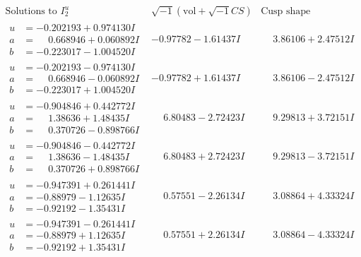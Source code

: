\documentclass[1p]{elsarticle_modified}
\theoremstyle{definition}
\newcommand{\I}{\sqrt{-1}}
\begin{document}
$$\begin{array}{c|c|c}  
\text{Solutions to }I^u_{2}& \I (\text{vol} + \sqrt{-1}CS) & \text{Cusp shape}\\
 \hline 
\begin{aligned}
u &= -0.202193 + 0.974130 I \\
a &= \phantom{-}0.668946 + 0.060892 I \\
b &= -0.223017 - 1.004520 I\end{aligned}
 & -0.97782 - 1.61437 I & \phantom{-}3.86106 + 2.47512 I \\ \hline\begin{aligned}
u &= -0.202193 - 0.974130 I \\
a &= \phantom{-}0.668946 - 0.060892 I \\
b &= -0.223017 + 1.004520 I\end{aligned}
 & -0.97782 + 1.61437 I & \phantom{-}3.86106 - 2.47512 I \\ \hline\begin{aligned}
u &= -0.904846 + 0.442772 I \\
a &= \phantom{-}1.38636 + 1.48435 I \\
b &= \phantom{-}0.370726 - 0.898766 I\end{aligned}
 & \phantom{-}6.80483 - 2.72423 I & \phantom{-}9.29813 + 3.72151 I \\ \hline\begin{aligned}
u &= -0.904846 - 0.442772 I \\
a &= \phantom{-}1.38636 - 1.48435 I \\
b &= \phantom{-}0.370726 + 0.898766 I\end{aligned}
 & \phantom{-}6.80483 + 2.72423 I & \phantom{-}9.29813 - 3.72151 I \\ \hline\begin{aligned}
u &= -0.947391 + 0.261441 I \\
a &= -0.88979 - 1.12635 I \\
b &= -0.92192 - 1.35431 I\end{aligned}
 & \phantom{-}0.57551 - 2.26134 I & \phantom{-}3.08864 + 4.33324 I \\ \hline\begin{aligned}
u &= -0.947391 - 0.261441 I \\
a &= -0.88979 + 1.12635 I \\
b &= -0.92192 + 1.35431 I\end{aligned}
 & \phantom{-}0.57551 + 2.26134 I & \phantom{-}3.08864 - 4.33324 I \\ \hline\begin{aligned}

\end{aligned}
\end{array}$$
\end{document}
